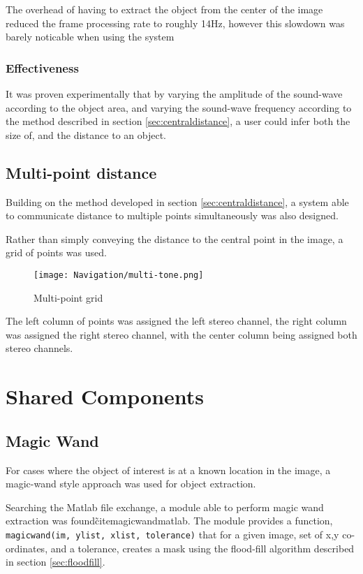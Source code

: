 The overhead of having to extract the object from the center of the image reduced the frame processing rate to roughly 14Hz, however this slowdown was barely noticable when using the system

\subsubsection{Effectiveness}
It was proven experimentally that by varying the amplitude of the sound-wave according to the object area, and varying the sound-wave frequency according to the method described in section \ref{sec:centraldistance}, a user could infer both the size of, and the distance to an object. 


\subsection{Multi-point distance}
Building on the method developed in section \ref{sec:centraldistance}, a system able to communicate distance to multiple points simultaneously was also designed.

Rather than simply conveying the distance to the central point in the image, a grid of points was used.

\begin{figure}
    \centering
    \texttt{[image: Navigation/multi-tone.png]}
    \caption{Multi-point grid}
\end{figure}

The left column of points was assigned the left stereo channel, the right column was assigned the right stereo channel, with the center column being assigned both stereo channels. 

\section{Shared Components}
\label{sec:sharedcomponents}
\subsection{Magic Wand}
\label{sec:magicwand}
For cases where the object of interest is at a known location in the image, a magic-wand style approach was used for object extraction. 

Searching the Matlab file exchange, a module able to perform magic wand extraction was found\~cite{magicwandmatlab}. The module provides a function, \texttt{magicwand(im, ylist, xlist, tolerance)} that for a given image, set of {x,y} co-ordinates, and a tolerance, creates a mask using the flood-fill algorithm described in section \ref{sec:floodfill}.

